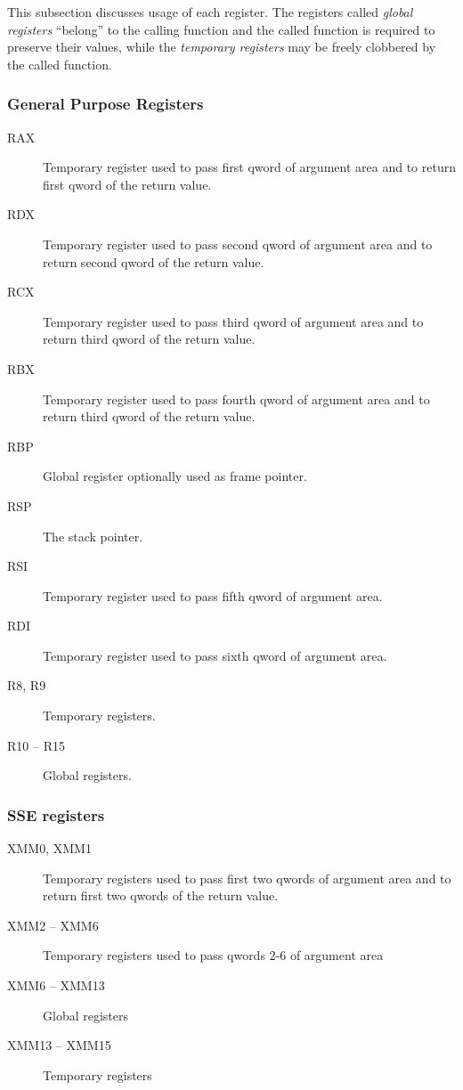 This subsection discusses usage of each register.  The registers called
\emph{global registers} ``belong'' to the calling function and the called function
is required to preserve their values, while the \emph{temporary registers} may
be freely clobbered by the called function.

\subsubsection {General Purpose Registers}
\begin{description}
\item [RAX]
Temporary register used to pass first qword of argument area and to return
first qword of the return value.
\item [RDX]
Temporary register used to pass second qword of argument area
and to return second qword of the return value.
\item [RCX] Temporary register used to pass third qword of argument area
and to return third qword of the return value.
\item [RBX] Temporary register used to pass fourth qword of argument area
and to return third qword of the return value.
\item [RBP] Global register optionally used as frame pointer.
\item [RSP] The stack pointer.
\item [RSI]
Temporary register used to pass fifth qword of argument area.
\item [RDI] 
Temporary register used to pass sixth qword of argument area.
\item [R8, R9] Temporary registers.
\item [R10 -- R15] Global registers.
\end{description}


\subsubsection {SSE registers}
\begin{description}
\item [XMM0, XMM1] Temporary registers used to pass first two qwords
  of argument area and to return first two qwords of the return value.
\item [XMM2 -- XMM6] Temporary registers used to pass qwords 2-6 of argument area
\item [XMM6 -- XMM13] Global registers
\item [XMM13 -- XMM15] Temporary registers
\end{description}


